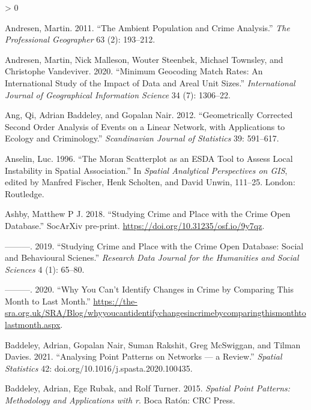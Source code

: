 \documentclass[
  krantz2]{krantz}
\newlength{\cslhangindent}
\newenvironment{CSLReferences}[2] %
 {%
  \setlength{\parindent}{0pt}
  \ifodd #1 \everypar{\setlength{\hangindent}{\cslhangindent}}\ignorespaces\fi
  \ifnum #2 > 0
  \setlength{\parskip}{#2\baselineskip}
  \fi
 }%
 {}
\begin{document}
\hypertarget{refs}{}
\begin{CSLReferences}{1}{0}
\leavevmode\hypertarget{ref-Andresen_2011}{}%
Andresen, Martin. 2011. {``The Ambient Population and Crime Analysis.''} \emph{The Professional Geographer} 63 (2): 193--212.

\leavevmode\hypertarget{ref-Andresen_2020}{}%
Andresen, Martin, Nick Malleson, Wouter Steenbek, Michael Townsley, and Christophe Vandeviver. 2020. {``Minimum Geocoding Match Rates: An International Study of the Impact of Data and Areal Unit Sizes.''} \emph{International Journal of Geographical Information Science} 34 (7): 1306--22.

\leavevmode\hypertarget{ref-Ang_2012}{}%
Ang, Qi, Adrian Baddeley, and Gopalan Nair. 2012. {``Geometrically Corrected Second Order Analysis of Events on a Linear Network, with Applications to Ecology and Criminology.''} \emph{Scandinavian Journal of Statistics} 39: 591--617.

\leavevmode\hypertarget{ref-Anselin_1996}{}%
Anselin, Luc. 1996. {``The Moran Scatterplot as an ESDA Tool to Assess Local Instability in Spatial Association.''} In \emph{Spatial Analytical Perspectives on GIS}, edited by Manfred Fischer, Henk Scholten, and David Unwin, 111--25. London: Routledge.

\leavevmode\hypertarget{ref-Ashby_2018}{}%
Ashby, Matthew P J. 2018. {``Studying Crime and Place with the Crime Open Database.''} SocArXiv pre-print. \url{https://doi.org/10.31235/osf.io/9y7qz}.

\leavevmode\hypertarget{ref-Ashby_2019}{}%
---------. 2019. {``Studying Crime and Place with the Crime Open Database: Social and Behavioural Scienes.''} \emph{Research Data Journal for the Humanities and Social Sciences} 4 (1): 65--80.

\leavevmode\hypertarget{ref-Ashby_2020}{}%
---------. 2020. {``Why You Can't Identify Changes in Crime by Comparing This Month to Last Month.''} \url{https://the-sra.org.uk/SRA/Blog/whyyoucantidentifychangesincrimebycomparingthismonthtolastmonth.aspx}.

\leavevmode\hypertarget{ref-Baddeley_2021}{}%
Baddeley, Adrian, Gopalan Nair, Suman Rakshit, Greg McSwiggan, and Tilman Davies. 2021. {``Analysing Point Patterns on Networks --- a Review.''} \emph{Spatial Statistics} 42: doi.org/10.1016/j.spasta.2020.100435.

\leavevmode\hypertarget{ref-Baddeley_2016}{}%
Baddeley, Adrian, Ege Rubak, and Rolf Turner. 2015. \emph{Spatial Point Patterns: Methodology and Applications with r}. Boca Ratón: CRC Press.


\end{CSLReferences}
\end{document}
